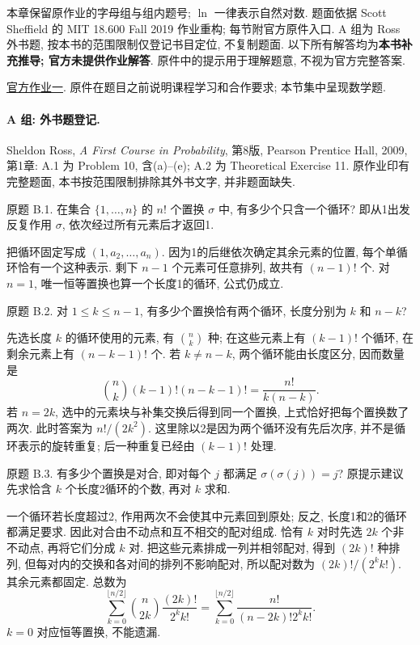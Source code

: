 本章保留原作业的字母组与组内题号; $\ln$ 一律表示自然对数. 题面依据 Scott Sheffield 的 MIT 18.600 Fall 2019 作业重构; 每节附官方原件入口. A 组为 Ross 外书题, 按本书的范围限制仅登记书目定位, 不复制题面. 以下所有解答均为\textbf{本书补充推导; 官方未提供作业解答}. 原件中的提示用于理解题意, 不视为官方完整答案.

\href{https://ocw.mit.edu/courses/18-600-probability-and-random-variables-fall-2019/resources/mit18_600f19_pset1/}{官方作业一}. 原件在题目之前说明课程学习和合作要求; 本节集中呈现数学题.

\paragraph{A 组: 外书题登记.}
Sheldon Ross, \textit{A First Course in Probability}, 第8版, Pearson Prentice Hall, 2009, 第1章: A.1 为 Problem 10, 含(a)--(e); A.2 为 Theoretical Exercise 11. 原作业印有完整题面, 本书按范围限制排除其外书文字, 并非题面缺失.

\begin{exercise}\label{ps1-b1}
原题 B.1. 在集合 $\{1,\ldots,n\}$ 的 $n!$ 个置换 $\sigma$ 中, 有多少个只含一个循环? 即从1出发反复作用 $\sigma$, 依次经过所有元素后才返回1.
\end{exercise}
\begin{solution}
把循环固定写成 $(1,a_2,\ldots,a_n)$. 因为1的后继依次确定其余元素的位置, 每个单循环恰有一个这种表示. 剩下 $n-1$ 个元素可任意排列, 故共有 $(n-1)!$ 个. 对 $n=1$, 唯一恒等置换也算一个长度1的循环, 公式仍成立.
\end{solution}

\begin{exercise}\label{ps1-b2}
原题 B.2. 对 $1\le k\le n-1$, 有多少个置换恰有两个循环, 长度分别为 $k$ 和 $n-k$?
\end{exercise}
\begin{solution}
先选长度 $k$ 的循环使用的元素, 有 $\binom nk$ 种; 在这些元素上有 $(k-1)!$ 个循环, 在剩余元素上有 $(n-k-1)!$ 个. 若 $k\ne n-k$, 两个循环能由长度区分, 因而数量是
\[
\binom nk(k-1)!(n-k-1)!=\frac{n!}{k(n-k)}.
\]
若 $n=2k$, 选中的元素块与补集交换后得到同一个置换, 上式恰好把每个置换数了两次. 此时答案为 $n!/(2k^2)$. 这里除以2是因为两个循环没有先后次序, 并不是循环表示的旋转重复; 后一种重复已经由 $(k-1)!$ 处理.
\end{solution}

\begin{exercise}\label{ps1-b3}
原题 B.3. 有多少个置换是对合, 即对每个 $j$ 都满足 $\sigma(\sigma(j))=j$? 原提示建议先求恰含 $k$ 个长度2循环的个数, 再对 $k$ 求和.
\end{exercise}
\begin{solution}
一个循环若长度超过2, 作用两次不会使其中元素回到原处; 反之, 长度1和2的循环都满足要求. 因此对合由不动点和互不相交的配对组成. 恰有 $k$ 对时先选 $2k$ 个非不动点, 再将它们分成 $k$ 对. 把这些元素排成一列并相邻配对, 得到 $(2k)!$ 种排列, 但每对内的交换和各对间的排列不影响配对, 所以配对数为 $(2k)!/(2^k k!)$. 其余元素都固定. 总数为
\[
\sum_{k=0}^{\lfloor n/2\rfloor}\binom n{2k}\frac{(2k)!}{2^k k!}
=\sum_{k=0}^{\lfloor n/2\rfloor}\frac{n!}{(n-2k)!2^k k!}.
\]
$k=0$ 对应恒等置换, 不能遗漏.
\end{solution}

